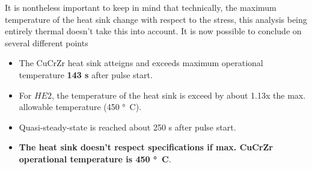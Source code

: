 \normalsize{\indent  It is nontheless important to keep in mind that technically, the maximum temperature of the heat sink change with respect to the stress, this analysis being entirely thermal doesn't take this into account. It is now possible to conclude on several different points
\begin{itemize}
    \item The \acrshort{CuCrZr} heat sink atteigns and exceeds maximum operational temperature {\bfseries 143 \unit{s} } after pulse start.
    \item For $HE2$, the temperature of the heat sink is exceed by about 1.13x the max. allowable temperature (450 \unit{\si{\degree}C}).
    \item Quasi-steady-state is reached about 250 \unit{s} after pulse start.
    \item {\bfseries The heat sink doesn't respect specifications if max. \acrshort{CuCrZr} operational temperature is 450 \unit{\si{\degree}C}}.
\end{itemize}
}
